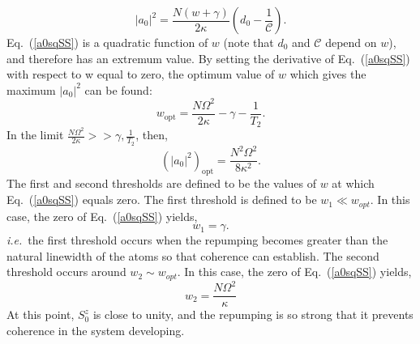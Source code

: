 \documentclass[aps,
twocolumn,
superscriptaddress,groupedaddress]{revtex4}
\begin{document}
\begin{equation}
|a_0|^2=\frac{N(w+\gamma)}{2 \kappa} (d_0 - \frac{1}{\mathcal{C}}).
\label{a0sqSS}
\end{equation}
Eq.~(\ref{a0sqSS}) is a quadratic function of $w$ (note that $d_0$ and
$\mathcal C$ depend on $w$), and therefore has an extremum value. By
setting the derivative of Eq.~(\ref{a0sqSS}) with respect to w equal
to zero, the optimum value of $w$ which gives the maximum $|a_0|^2$
can be found:
\begin{equation}
w_{\mathrm{opt}} = \frac{N \Omega^2}{2\kappa} - \gamma - \frac{1}{T_2}.
\label{wopt}
\end{equation}
In the limit $\frac{N\Omega^2}{2 \kappa} >> \gamma, \frac{1}{T_2}$, then,
\begin{equation}
(|a_0|^2)_{\mathrm{opt}}= \frac{N^2 \Omega^2}{8\kappa^2}.
\label{adaopt}
\end{equation}
The first and second thresholds are defined to be the values of $w$ at
which Eq.~(\ref{a0sqSS}) equals zero. The first threshold is defined
to be $w_1 \ll w_{opt}$. In this case, the zero of Eq.~(\ref{a0sqSS})
yields,
\begin{equation}
w_1 = \gamma.
\label{FirstThreshold}
\end{equation} 
{\em i.e.}\ the first threshold occurs
when the repumping becomes greater than the natural linewidth of the
atoms so that coherence can establish.  The second
threshold occurs around $w_2 \sim w_{opt}$. In this case,
the zero of Eq.~(\ref{a0sqSS}) yields,
\begin{equation}
w_2 =  \frac{N \Omega^2}{\kappa}
\end{equation} 
At this point, $S_0^{z}$ is close to unity, and the repumping is so
strong that it prevents coherence in the system developing.
\end{document}
